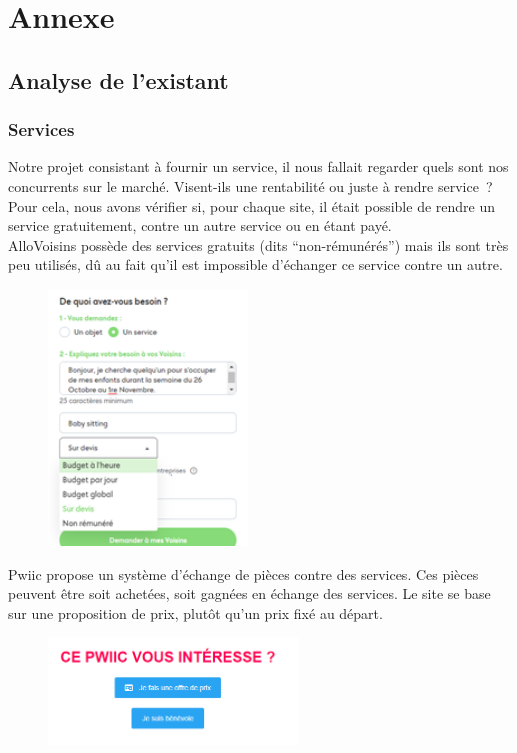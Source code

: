 \documentclass[a4paper,11pt]{article}
\begin{document}
\section{Annexe}

\subsection{Analyse de l'existant}

\subsubsection{Services}

Notre projet consistant à fournir un service, il nous fallait regarder quels sont nos concurrents sur le marché.
Visent-ils une rentabilité ou juste à rendre service ? Pour cela, nous avons vérifier si, pour chaque site,
il était possible de rendre un service gratuitement, contre un autre service ou en étant payé.\\

AlloVoisins possède des services gratuits (dits “non-rémunérés”) mais ils sont très peu utilisés,
dû au fait qu’il est impossible d’échanger ce service contre un autre.\\

\begin{figure}[H]
  \includegraphics[width=200px]{images/services-allovoisins.png}
  \label{fig:services-allovoisins}
\end{figure}

Pwiic propose un système d’échange de pièces contre des services. Ces pièces peuvent être soit achetées,
soit gagnées en échange des services. Le site se base sur une proposition de prix, plutôt qu’un prix fixé au départ.\\

\begin{figure}[H]
  \includegraphics[width=250px]{images/pieces-pwiic.png}
  \label{fig:pieces-pwiic}
\end{figure}
\end{document}

